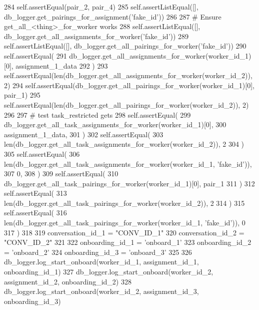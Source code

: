 \begin{DoxyCode}
284         self.assertEqual(pair\_2, pair\_4)
285         self.assertListEqual([], db\_logger.get\_pairings\_for\_assignment(\textcolor{stringliteral}{'fake\_id'}))
286 
287         \textcolor{comment}{# Ensure get\_all\_<thing>\_for\_worker works}
288         self.assertListEqual([], db\_logger.get\_all\_assignments\_for\_worker(\textcolor{stringliteral}{'fake\_id'}))
289         self.assertListEqual([], db\_logger.get\_all\_pairings\_for\_worker(\textcolor{stringliteral}{'fake\_id'}))
290         self.assertEqual(
291             db\_logger.get\_all\_assignments\_for\_worker(worker\_id\_1)[0], assignment\_1\_data
292         )
293         self.assertEqual(len(db\_logger.get\_all\_assignments\_for\_worker(worker\_id\_2)), 2)
294         self.assertEqual(db\_logger.get\_all\_pairings\_for\_worker(worker\_id\_1)[0], pair\_1)
295         self.assertEqual(len(db\_logger.get\_all\_pairings\_for\_worker(worker\_id\_2)), 2)
296 
297         \textcolor{comment}{# test task\_restricted gets}
298         self.assertEqual(
299             db\_logger.get\_all\_task\_assignments\_for\_worker(worker\_id\_1)[0],
300             assignment\_1\_data,
301         )
302         self.assertEqual(
303             len(db\_logger.get\_all\_task\_assignments\_for\_worker(worker\_id\_2)), 2
304         )
305         self.assertEqual(
306             len(db\_logger.get\_all\_task\_assignments\_for\_worker(worker\_id\_1, \textcolor{stringliteral}{'fake\_id'})),
307             0,
308         )
309         self.assertEqual(
310             db\_logger.get\_all\_task\_pairings\_for\_worker(worker\_id\_1)[0], pair\_1
311         )
312         self.assertEqual(
313             len(db\_logger.get\_all\_task\_pairings\_for\_worker(worker\_id\_2)), 2
314         )
315         self.assertEqual(
316             len(db\_logger.get\_all\_task\_pairings\_for\_worker(worker\_id\_1, \textcolor{stringliteral}{'fake\_id'})), 0
317         )
318 
319         conversation\_id\_1 = \textcolor{stringliteral}{"CONV\_ID\_1"}
320         conversation\_id\_2 = \textcolor{stringliteral}{"CONV\_ID\_2"}
321 
322         onboarding\_id\_1 = \textcolor{stringliteral}{'onboard\_1'}
323         onboarding\_id\_2 = \textcolor{stringliteral}{'onboard\_2'}
324         onboarding\_id\_3 = \textcolor{stringliteral}{'onboard\_3'}
325 
326         db\_logger.log\_start\_onboard(worker\_id\_1, assignment\_id\_1, onboarding\_id\_1)
327         db\_logger.log\_start\_onboard(worker\_id\_2, assignment\_id\_2, onboarding\_id\_2)
328         db\_logger.log\_start\_onboard(worker\_id\_2, assignment\_id\_3, onboarding\_id\_3)

\end{DoxyCode}
